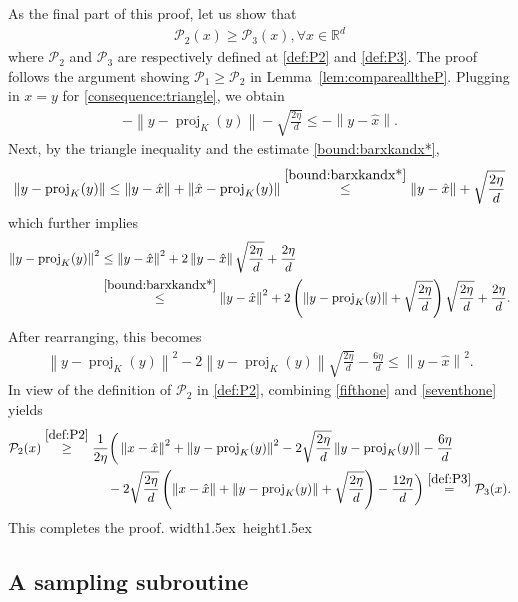 \documentclass[11pt,letterpaper]{article}
\newcommand{\R}{\mathbb{R}}
\newcommand{\norm}[1]{\left\lVert #1 \right\rVert}
\newcommand{\proj}{\operatorname{proj}}
\newcommand{\brac}[1]{\left( #1\right)}
\newcommand*{\QEDA}{\hfill\hbox{\vrule width1.5ex height1.5ex}}
\begin{document}
As the final part of this proof, let us show that 
\begin{align*}
    \mathcal{P}_2(x)\ge \mathcal{P}_3(x), \forall x\in \R^d
\end{align*}
where $\mathcal{P}_2$ and $\mathcal{P}_3$ are respectively defined at \eqref{def:P2} and \eqref{def:P3}. The proof follows the argument showing $\mathcal{P}_1\geq \mathcal{P}_2$ in Lemma~\ref{lem:comparealltheP}. 
 Plugging in $x=y$ for \eqref{consequence:triangle}, we obtain
\begin{align}
\label{seventhone}
    -\norm{y-\proj_K(y)}-\sqrt{\frac{2\eta}{d}}\leq -\norm{y-\hat{x}}. 
\end{align}
Next, by the triangle inequality and the estimate \eqref{bound:barxkandx*}, 
\begin{align*}
    \norm{y-\proj_K(y)}\leq \norm{y-\hat x}+\norm{\hat x -\proj_K(y)}\stackrel{\eqref{bound:barxkandx*}}{\leq} \norm{y-\hat x}+\sqrt{\frac{2\eta}{d}}
\end{align*}
which further implies 
\begin{align*}
    \norm{y-\proj_K(y)}^2&\leq \norm{y-\hat x}^2+2\norm{y-\hat x}\sqrt{\frac{2\eta}{d}}+\frac{2\eta}{d}\\
    &\stackrel{\eqref{bound:barxkandx*}}{\leq} \norm{y-\hat x}^2+2\brac{\norm{y-\proj_K(y) }+\sqrt{\frac{2\eta}{d}}}\sqrt{\frac{2\eta}{d}}+\frac{2\eta}{d}. 
\end{align*}
After rearranging, this becomes 
\begin{align}
\label{fifthone}
     \norm{y-\proj_K(y)}^2-2\norm{y-\proj_K(y)}\sqrt{\frac{2\eta}{d}}-\frac{6\eta}{d}\leq \norm{y-\hat{x}}^2.
\end{align} 
In view of the definition of $\mathcal{P}_2$ in \eqref{def:P2}, combining \eqref{fifthone} and \eqref{seventhone} yields
\begin{align*}
    \mathcal{P}_2(x)&\stackrel{\eqref{def:P2}}\geq \frac{1}{2\eta}\bigg( \norm{x-\hat{x}}^2+\norm{y-\proj_K(y)}^2-2\sqrt{\frac{2\eta}{d}}\norm{y-\proj_K(y)}-\frac{6\eta}{d} \\
    &\qquad\qquad\quad-2\sqrt{\frac{2\eta}{d}}\brac{\norm{x-\hat{x}}+\norm{y-\proj_K(y)}+\sqrt{\frac{2\eta}{d}}}-\frac{12\eta}{d} \bigg)\stackrel{\eqref{def:P3}}=\mathcal{P}_3(x). 
\end{align*}
This completes the proof. 
\QEDA

\subsection{A sampling subroutine}
\label{appendix:generatesampleseparation}
\end{document}
